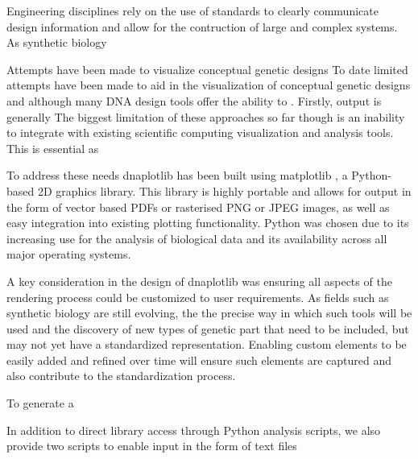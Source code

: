 \documentclass{bioinfo}
\begin{document}
Engineering disciplines rely on the use of standards to clearly communicate design information and allow for the contruction of large and complex systems. As synthetic biology 

Attempts have been made to visualize conceptual genetic designs 
To date limited attempts have been made to aid in the visualization of conceptual genetic designs \citep{Bhatia13a} and although many DNA design tools offer the ability to . Firstly, output is generally 
The biggest limitation of these approaches so far though is an inability to integrate with existing scientific computing visualization and analysis tools. This is essential as 



To address these needs dnaplotlib has been built using matplotlib \citep{Hunter07a}, a Python-based 2D graphics library. This library is highly portable and allows for output in the form of vector based PDFs or rasterised PNG or JPEG images, as well as easy integration into existing plotting functionality. Python was chosen due to its increasing use for the analysis of biological data \citep{Cock09a} and its availability across all major operating systems.

A key consideration in the design of dnaplotlib was ensuring all aspects of the rendering process could be customized to user requirements. As fields such as synthetic biology are still evolving, the the precise way in which such tools will be used and the discovery of new types of genetic part that need to be included, but may not yet have a standardized representation. Enabling custom elements to be easily added and refined over time will ensure such elements are captured and also contribute to the standardization process. 

To generate a 

In addition to direct library access through Python analysis scripts, we also provide two scripts to enable input in the form of text files
\end{document}
